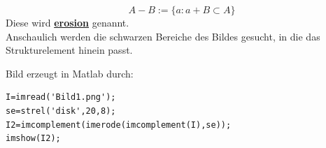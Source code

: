 \documentclass{article}
\theoremstyle{plain}
\theoremstyle{definition}
\numberwithin{equation}{section}
\newcommand{\mim}[1] {
\underline{\textbf{#1\index{#1}}}
}
\begin{document}
        \[A-B := \{a : a + B \subset A\}\]
        Diese wird \mim{erosion} genannt.\\
        Anschaulich werden die schwarzen Bereiche des Bildes gesucht, in die das Strukturelement hinein passt.
        \begin{center}
        \end{center}

        Bild erzeugt in Matlab durch:\\
        \begin{lstlisting}
I=imread('Bild1.png');
se=strel('disk',20,8);
I2=imcomplement(imerode(imcomplement(I),se));
imshow(I2);
        \end{lstlisting}
\end{document}
